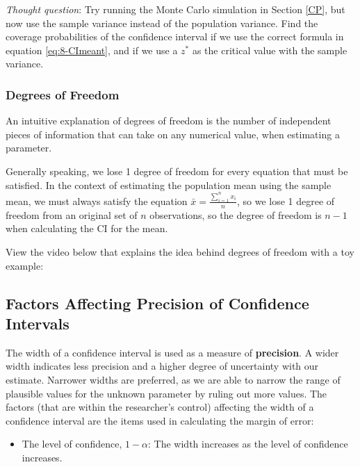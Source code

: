 \documentclass[
]{book}
\providecommand{\tightlist}{%
  \setlength{\itemsep}{0pt}\setlength{\parskip}{0pt}}
\begin{document}
\emph{Thought question}: Try running the Monte Carlo simulation in Section \ref{CP}, but now use the sample variance instead of the population variance. Find the coverage probabilities of the confidence interval if we use the correct formula in equation \eqref{eq:8-CImeant}, and if we use a \(z^*\) as the critical value with the sample variance.

\hypertarget{df}{%
\subsubsection{Degrees of Freedom}\label{df}}

An intuitive explanation of degrees of freedom is the number of independent pieces of information that can take on any numerical value, when estimating a parameter.

Generally speaking, we lose 1 degree of freedom for every equation that must be satisfied. In the context of estimating the population mean using the sample mean, we must always satisfy the equation \(\bar{x} = \frac{\sum_{i=1}^n x_i}{n}\), so we lose 1 degree of freedom from an original set of \(n\) observations, so the degree of freedom is \(n-1\) when calculating the CI for the mean.

View the video below that explains the idea behind degrees of freedom with a toy example:

\hypertarget{factors-affecting-precision-of-confidence-intervals}{%
\subsection{Factors Affecting Precision of Confidence Intervals}\label{factors-affecting-precision-of-confidence-intervals}}

The width of a confidence interval is used as a measure of \textbf{precision}. A wider width indicates less precision and a higher degree of uncertainty with our estimate. Narrower widths are preferred, as we are able to narrow the range of plausible values for the unknown parameter by ruling out more values. The factors (that are within the researcher's control) affecting the width of a confidence interval are the items used in calculating the margin of error:

\begin{itemize}
\tightlist
\item
  The level of confidence, \(1 - \alpha\): The width increases as the level of confidence increases.
\end{itemize}
\end{document}

